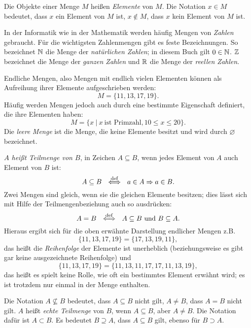 Die Objekte einer Menge $M$ heißen \emph{Elemente} von $M$. Die Notation
$ x \in M$ 
bedeutet, dass $x$ ein Element von $M$ ist, $x \not \in M$, dass $x$ kein
Element von $M$ ist.

In der Informatik wie in der Mathematik werden häufig Mengen von \emph{Zahlen} gebraucht.  Für die wichtigsten
Zahlenmengen gibt es feste Bezeichnungen.  So bezeichnet $\mathbb{N}$
die Menge der \emph{natürlichen Zahlen};  in diesem Buch gilt
$0\in\mathbb{N}$. 
$\mathbb{Z}$ bezeichnet die Menge der \emph{ganzen Zahlen} und $\mathbb{R}$ die Menge der
\emph{reellen Zahlen}.

Endliche Mengen, also Mengen mit endlich vielen Elementen
können als Aufreihung ihrer Elemente aufgeschrieben werden:
\[M = \{ 11, 13, 17, 19\}.\]
Häufig werden Mengen jedoch auch durch eine bestimmte Eigenschaft de\-fi\-niert,
die ihre Elementen haben:
\[M = \{x\ |\ x\ \mbox{ist Primzahl}, 10 \le x \le 20\}.\]
Die \emph{leere Menge} %
ist die Menge, die keine Elemente besitzt und wird
durch $\varnothing$ bezeichnet.

\emph{$A$ heißt Teilmenge von $B$}, in Zeichen $A \subseteq B$, 
wenn jedes Element von $A$ auch Element von $B$ ist:
\[A \subseteq B\ \ \diff\ \ 
a \in A \Rightarrow a \in B.\]
Zwei Mengen sind gleich, wenn sie die gleichen Elemente besitzen; 
dies lässt sich mit Hilfe der Teilmengenbeziehung auch so ausdrücken:
\[A = B\ \ \stackrel{\rm def}{\Longleftrightarrow}\ \ A \subseteq B\ \mbox{und}\ B \subseteq A.\]
Hieraus ergibt sich für die oben erwähnte Darstellung endlicher Mengen
z.B.
\[\{11,13,17,19\} =\{17,13,19,11\},\]
das heißt die \emph{Reihenfolge} der Elemente ist unerheblich (beziehungsweise es gibt
gar keine ausgezeichnete Reihenfolge) und
\[\{11,13,17,19\} = \{11,13,11,17,17,11,13,19\},\]
das heißt es spielt keine Rolle, wie oft ein bestimmtes Element erwähnt wird; es
ist trotzdem nur einmal in der Menge enthalten.

Die Notation $A \not \subseteq B$ bedeutet, dass $A \subseteq B$ nicht gilt, $A
\not = B$, dass $A = B$ nicht gilt. $A$ heißt \emph{echte Teilmenge} von $B$,
wenn $A \subseteq B$, aber $A \not = B$. Die Notation dafür ist $A \subset B$.
\index{*@$\subset$}\index{*@$\supseteq$}\index{*@$\supset$}
Es bedeutet $B \supseteq A$, dass $A \subseteq B$ gilt, ebenso für
$B \supset A$. 

